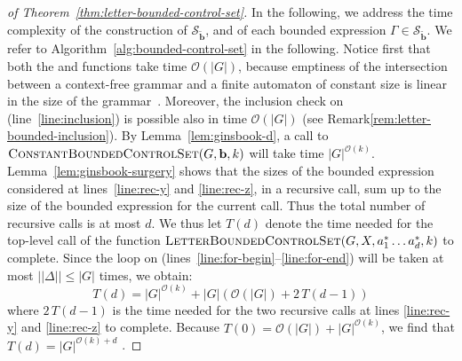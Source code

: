 \documentclass[final]{llncs}
\def\card#1{{|\!|{#1}|\!|}}
\def\len#1{{\vert{#1}\vert}}
\def\prod{\Delta}
\def\pat{{\mathbf{b}}}
\def\patt{{\widetilde{\mathbf{b}}}}
\begin{document}
\begin{proof}[of Theorem~\ref{thm:letter-bounded-control-set}]
In the following, we address the time complexity of the construction
of $\mathcal{S}_\patt$, and of each bounded expression
$\Gamma\in\mathcal{S}_\patt$. We refer to
Algorithm~\ref{alg:bounded-control-set} in the following. Notice first
that both the 
and  functions take time
$\mathcal{O}(\len{G})$, because emptiness of the intersection between
a context-free grammar and a finite automaton of constant size is linear in
the size of the grammar~\cite[Section~5]{BEF+ipl}. Moreover, the inclusion check on
(line~\ref{line:inclusion}) is possible also in time
$\mathcal{O}(\len{G})$ (see Remark\ref{rem:letter-bounded-inclusion}). By
Lemma~\ref{lem:ginsbook-d}, a call to
$\Call{ConstantBoundedControlSet}{G,\pat,k}$ will take time
$\len{G}^{\mathcal{O}(k)}$. Lemma~\ref{lem:ginsbook-surgery} shows
that the sizes of the bounded expression considered at
lines~\ref{line:rec-y} and \ref{line:rec-z}, in a recursive call, sum
up to the size of the bounded expression for the current
call. Thus the total number of recursive calls is at most \(d\).  We
thus let $T(d)$ denote the time needed for the top-level call of the
function $\Call{LetterBoundedControlSet}{G,X,a_1^* \ldots a_d^*,k}$ to
complete. Since the loop on
(lines~\ref{line:for-begin}--\ref{line:for-end}) will be taken at most
$\card{\prod}\leq\len{G}$ times, we obtain:
\[ T(d) = \len{G}^{\mathcal{O}(k)} + \len{G}( \mathcal{O}(\len{G}) + 2\, T(d{-}1))\]
where $2\, T(d{-}1)$ is the time needed for the two recursive calls at
lines \ref{line:rec-y} and \ref{line:rec-z} to complete.
Because \(T(0)=\mathcal{O}(\len{G}) + \len{G}^{\mathcal{O}(k)} \), we
find that $T(d) = \len{G}^{\mathcal{O}(k)+d}$ .


\end{proof}
\end{document}
